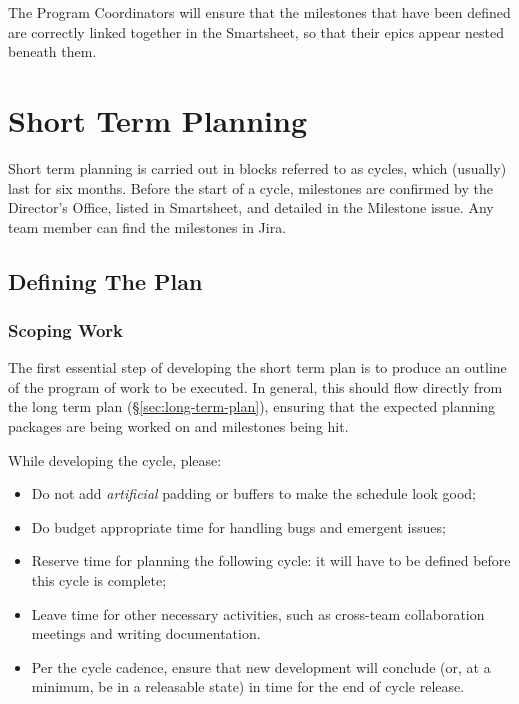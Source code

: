 The Program Coordinators will ensure that the milestones that have been defined are correctly linked together in the Smartsheet, so that their epics appear nested beneath them.


\section{Short Term Planning}
\label{sec:cycle-plan}

Short term planning is carried out in blocks referred to as \glspl{cycle}, which (usually) last for six months.
Before the start of a \gls{cycle}, milestones are confirmed by the Director's Office, listed in Smartsheet, and detailed in the Milestone issue. Any team member can find the milestones in Jira.

\subsection{Defining The Plan}

\subsubsection{Scoping Work}

The first essential step of developing the short term plan is to produce an outline of the program of work to be executed.
In general, this should flow directly from the long term plan (\S\ref{sec:long-term-plan}), ensuring that the expected planning packages are being worked on and milestones being hit.

While developing the \gls{cycle}, please:

\begin{itemize}
\item
  Do not add \emph{artificial} padding or buffers to make the schedule look good;
\item
  Do budget appropriate time for handling bugs and emergent issues;
\item
  Reserve time for planning the following \gls{cycle}: it will have to be defined before this \gls{cycle} is complete;
\item
  Leave time for other necessary activities, such as cross-team collaboration meetings and writing documentation.
\item
  Per the \gls{cycle} cadence, ensure that new development will conclude (or, at a minimum, be in a releasable state) in time for the end of \gls{cycle} release.
\end{itemize}

